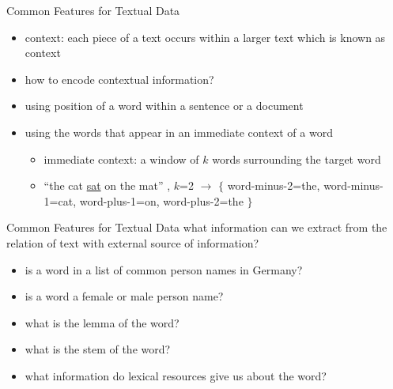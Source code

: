 \begin{frame}{Common Features for Textual Data}
\begin{itemize}
\item<1-> context: each piece of a text occurs within a larger text which is known as context
\item<2-> how to encode contextual information?
    \item<3-> using position of a word within a sentence or a document
    \item<4-> using the words that appear in an immediate context of a word
    \begin{itemize}
        \item<5-> immediate context: a window of $k$ words surrounding the target word
        \item<6-> ``the cat \underline{sat} on the mat'' , $k$=2 $\rightarrow$ $\{$ word-minus-2=the, word-minus-1=cat, word-plus-1=on, word-plus-2=the $\}$
    \end{itemize}
\end{itemize}
\end{frame}
\begin{frame}{Common Features for Textual Data}
    what information can we extract from the relation of text with external source of information?
    \begin{itemize}
        \item<1-> is a word in a list of common person names in Germany? 
        \item<2-> is a word a female or male person name?
        \item<3-> what is the lemma of the word?
        \item<4-> what is the stem of the word?
        \item<5-> what information do lexical resources give us about the word?
    \end{itemize}
\end{frame}